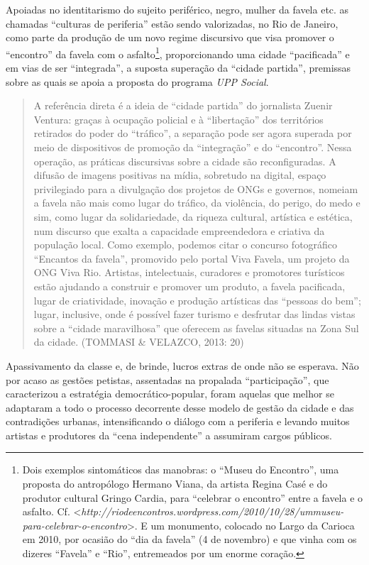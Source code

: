 Apoiadas no identitarismo do sujeito periférico, negro, mulher da favela
etc. as chamadas ``culturas de periferia'' estão sendo valorizadas, no
Rio de Janeiro, como parte da produção de um novo regime discursivo que
visa promover o ``encontro'' da favela com o asfalto\footnote{Dois
  exemplos sintomáticos das manobras: o ``Museu do Encontro'', uma
  proposta do antropólogo Hermano Viana, da artista Regina Casé e do
  produtor cultural Gringo Cardia, para ``celebrar o encontro'' entre a
  favela e o asfalto. Cf.
  \textless{}\emph{http://riodeencontros.wordpress.com/2010/10/28/ummuseu-para-celebrar-o-encontro}\textgreater{}.
  E um monumento, colocado no Largo da Carioca em 2010, por ocasião do
  ``dia da favela'' (4 de novembro) e que vinha com os dizeres
  ``Favela'' e ``Rio'', entremeados por um enorme coração.},
proporcionando uma cidade ``pacificada'' e em vias de ser ``integrada'',
a suposta superação da ``cidade partida'', premissas sobre as quais se
apoia a proposta do programa \emph{UPP Social}.

\begin{quote}
A referência direta é a ideia de ``cidade partida'' do jornalista Zuenir
Ventura: graças à ocupação policial e à ``libertação'' dos territórios
retirados do poder do ``tráfico'', a separação pode ser agora superada
por meio de dispositivos de promoção da ``integração'' e do
``encontro''. Nessa operação, as práticas discursivas sobre a cidade são
reconfiguradas. A difusão de imagens positivas na mídia, sobretudo na
digital, espaço privilegiado para a divulgação dos projetos de ONGs e
governos, nomeiam a favela não mais como lugar do tráfico, da violência,
do perigo, do medo e sim, como lugar da solidariedade, da riqueza
cultural, artística e estética, num discurso que exalta a capacidade
empreendedora e criativa da população local. Como exemplo, podemos citar
o concurso fotográfico ``Encantos da favela'', promovido pelo portal
Viva Favela, um projeto da ONG Viva Rio. Artistas, intelectuais,
curadores e promotores turísticos estão ajudando a construir e promover
um produto, a favela pacificada, lugar de criatividade, inovação e
produção artísticas das ``pessoas do bem''; lugar, inclusive, onde é
possível fazer turismo e desfrutar das lindas vistas sobre a ``cidade
maravilhosa'' que oferecem as favelas situadas na Zona Sul da cidade.
(TOMMASI \& VELAZCO, 2013: 20)
\end{quote}

Apassivamento da classe e, de brinde, lucros extras de onde não se
esperava. Não por acaso as gestões petistas, assentadas na propalada
``participação'', que caracterizou a estratégia democrático-popular,
foram aquelas que melhor se adaptaram a todo o processo decorrente desse
modelo de gestão da cidade e das contradições urbanas, intensificando o
diálogo com a periferia e levando muitos artistas e produtores da ``cena
independente'' a assumiram cargos públicos.

